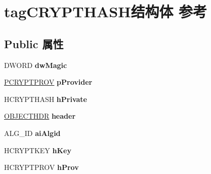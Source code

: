 \hypertarget{structtag_c_r_y_p_t_h_a_s_h}{}\section{tag\+C\+R\+Y\+P\+T\+H\+A\+S\+H结构体 参考}
\label{structtag_c_r_y_p_t_h_a_s_h}
\subsection*{Public 属性}
\begin{DoxyCompactItemize}
\item 
\mbox{\label{structtag_c_r_y_p_t_h_a_s_h_ae25afa54af2dc6592c6a63d0ef8ab40f}} 
D\+W\+O\+RD {\bfseries dw\+Magic}
\item 
\mbox{\label{structtag_c_r_y_p_t_h_a_s_h_a7b814f9501abc030e1673e0dd922f7cc}} 
\hyperlink{structtag_c_r_y_p_t_p_r_o_v}{P\+C\+R\+Y\+P\+T\+P\+R\+OV} {\bfseries p\+Provider}
\item 
\mbox{\label{structtag_c_r_y_p_t_h_a_s_h_a9a016b33966caf54ab88ac6ba4dc2c27}} 
H\+C\+R\+Y\+P\+T\+H\+A\+SH {\bfseries h\+Private}
\item 
\mbox{\label{structtag_c_r_y_p_t_h_a_s_h_a460a6d177914fd1745d44b419488b17a}} 
\hyperlink{structtag_o_b_j_e_c_t_h_d_r}{O\+B\+J\+E\+C\+T\+H\+DR} {\bfseries header}
\item 
\mbox{\label{structtag_c_r_y_p_t_h_a_s_h_a6e9d4d3395672969507552e1fa75e3d5}} 
A\+L\+G\+\_\+\+ID {\bfseries ai\+Algid}
\item 
\mbox{\label{structtag_c_r_y_p_t_h_a_s_h_ad58ba9115d5b3633cd57930dd32463b6}} 
H\+C\+R\+Y\+P\+T\+K\+EY {\bfseries h\+Key}
\item 
\mbox{\label{structtag_c_r_y_p_t_h_a_s_h_ac7d49084a4404f4a32406875ac02da03}} 
H\+C\+R\+Y\+P\+T\+P\+R\+OV {\bfseries h\+Prov}
\item 
\mbox{\label{structtag_c_r_y_p_t_h_a_s_h_a4fe67a40f87f9d2050a08ff5eb8aa982}} 

\end{DoxyCompactItemize}

